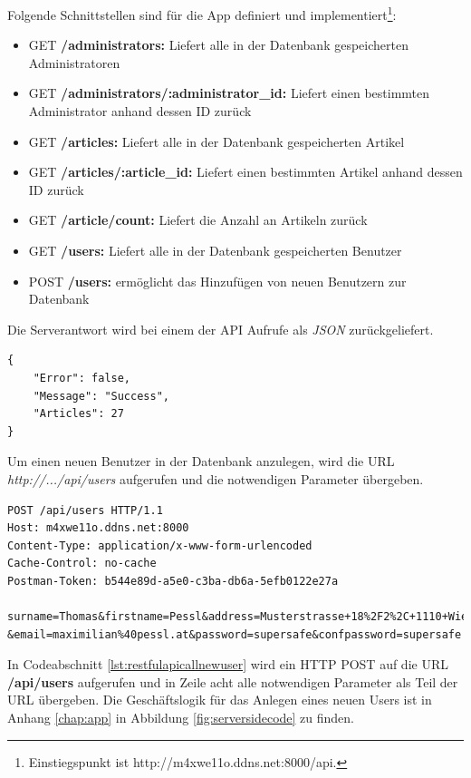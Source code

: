 	Folgende Schnittstellen sind für die App definiert und implementiert\footnote{Einstiegspunkt ist http://m4xwe11o.ddns.net:8000/api.}:

	\begin{itemize}
		\setlength\itemsep{0em}
		\item GET \textbf{/administrators:} Liefert alle in der Datenbank gespeicherten Administratoren
		\item GET \textbf{/administrators/:administrator\_id:} Liefert einen bestimmten Administrator anhand dessen ID zurück
		\item GET \textbf{/articles:} Liefert alle in der Datenbank gespeicherten Artikel
		\item GET \textbf{/articles/:article\_id:} Liefert einen bestimmten Artikel anhand dessen ID zurück
		\item GET \textbf{/article/count:} Liefert die Anzahl an Artikeln zurück
		\item GET \textbf{/users:} Liefert alle in der Datenbank gespeicherten Benutzer
		\item POST \textbf{/users:} ermöglicht das Hinzufügen von neuen Benutzern zur Datenbank
	\end{itemize}

	Die Serverantwort wird bei einem der API Aufrufe als \textit{JSON} zurückgeliefert.

	\begin{lstlisting}[caption={Serverantwort - \textbf{/article/count:} API Call},label={lst:restfulapicallcount},captionpos=b,style=JAVA-Own]
{
    "Error": false,
    "Message": "Success",
    "Articles": 27
}
	\end{lstlisting}

	Um einen neuen Benutzer in der Datenbank anzulegen, wird die URL \textit{http://.../api/users} aufgerufen und die notwendigen Parameter übergeben. 

	\begin{lstlisting}[caption={Anlegen eines neuen Benutzers durch URL Encoding},label={lst:restfulapicallnewuser},captionpos=b,style=JAVA-Own]
POST /api/users HTTP/1.1
Host: m4xwe11o.ddns.net:8000
Content-Type: application/x-www-form-urlencoded
Cache-Control: no-cache
Postman-Token: b544e89d-a5e0-c3ba-db6a-5efb0122e27a

surname=Thomas&firstname=Pessl&address=Musterstrasse+18%2F2%2C+1110+Wien
&email=maximilian%40pessl.at&password=supersafe&confpassword=supersafe
	\end{lstlisting}

	In Codeabschnitt \ref{lst:restfulapicallnewuser} wird ein HTTP POST auf die URL \textbf{/api/users} aufgerufen und in Zeile acht alle notwendigen Parameter als Teil der URL übergeben. Die Geschäftslogik für das Anlegen eines neuen Users ist in Anhang \ref{chap:app} in Abbildung \ref{fig:serversidecode} zu finden.













